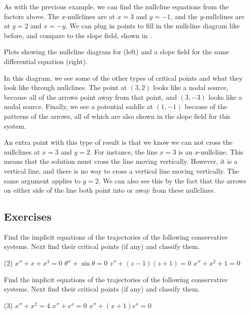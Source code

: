 \begin{exampleSol}
As with the previous example, we can find the nullcline equations from the factors above. The $x$-nullclines are at $x=3$ and $y=-1$, and the $y$-nullclines are at $y=2$ and $x=-y$. We can plug in points to fill in the nullcline diagram like before, and compare to the slope field, shown in . 

\begin{myfig}
\capstart
{}
\caption{Plots showing the nullcline diagram for  (left) and a slope field for the same differential equation (right). \label{fig:NCPlot2}}
\end{myfig}

In this diagram, we see some of the other types of critical points and what they look like through nullclines. The point at $(3,2)$ looks like a nodal source, because all of the arrows point away from that point, and $(3,-3)$ looks like a nodal source. Finally, we see a potential saddle at $(1,-1)$ because of the patterns of the arrows, all of which are also shown in the slope field for this system.

An extra point with this type of result is that we know we can not cross the nullclines at $x=3$ and $y=2$. For instance, the line $x=3$ is an $x$-nullcline. This means that the solution must cross the line moving vertically. However, it is a vertical line, and there is no way to cross a vertical line moving vertically. The same argument applies to $y=2$. We can also see this by the fact that the arrows on either side of the line both point into or away from these nullclines.
\end{exampleSol}


\subsection{Exercises}


\begin{exercise}
\pagebreak[2]
Find the implicit equations of the trajectories of the following
conservative systems.  Next find their critical points (if any) and classify them.
\begin{tasks}(2)
\task $x''+ x+x^3 = 0$
\task $\theta''+\sin \theta = 0$
\task $z''+ (z-1)(z+1) = 0$
\task $x''+ x^2+1 = 0$
\end{tasks}
\end{exercise}

\begin{exercise}\ansMark%
Find the implicit equations of the trajectories of the following
conservative systems.  Next find their critical points (if any) and classify them.
\begin{tasks}(3)
\task $x''+ x^2 = 4$
\task $x''+ e^x = 0$
\task $x''+ (x+1)e^x = 0$
\end{tasks}
\end{exercise}



